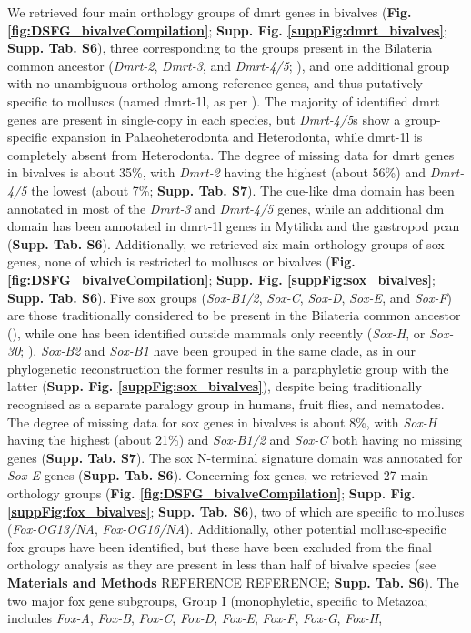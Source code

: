 \documentclass[../main.tex]{subfiles}
\begin{document}
We retrieved four main orthology groups of \gls{dmrt} genes in bivalves (\textbf{Fig. \ref{fig:DSFG_bivalveCompilation}}; \textbf{Supp. Fig. \ref{suppFig:dmrt_bivalves}}; \textbf{Supp. Tab. S6}), three corresponding to the groups present in the Bilateria common ancestor (\textit{Dmrt-2}, \textit{Dmrt-3}, and \textit{Dmrt-4/5}; \textbf{\cite{mawaribuchi2019independent}}), and one additional group with no unambiguous ortholog among reference genes, and thus putatively specific to molluscs (named \gls{dmrt-1l}, as per \textbf{\cite{li2018foxl2,evensen2022comparative}}). The majority of identified \gls{dmrt} genes are present in single-copy in each species, but \textit{Dmrt-4/5}s show a group-specific expansion in Palaeoheterodonta and Heterodonta, while \gls{dmrt-1l} is completely absent from Heterodonta. The degree of missing data for \gls{dmrt} genes in bivalves is about 35\%, with \textit{Dmrt-2} having the highest (about 56\%) and \textit{Dmrt-4/5} the lowest (about 7\%; \textbf{Supp. Tab. S7}). The \gls{cue}-like \gls{dma} domain has been annotated in most of the \textit{Dmrt-3} and \textit{Dmrt-4/5} genes, while an additional \gls{dm} domain has been annotated in \gls{dmrt-1l} genes in Mytilida and the gastropod \gls{pcan} (\textbf{Supp. Tab. S6}). Additionally, we retrieved six main orthology groups of \gls{sox} genes, none of which is restricted to molluscs or bivalves (\textbf{Fig. \ref{fig:DSFG_bivalveCompilation}}; \textbf{Supp. Fig. \ref{suppFig:sox_bivalves}}; \textbf{Supp. Tab. S6}). Five \gls{sox} groups (\textit{Sox-B1/2}, \textit{Sox-C}, \textit{Sox-D}, \textit{Sox-E}, and \textit{Sox-F}) are those traditionally considered to be present in the Bilateria common ancestor (\textbf{\cite{phochanukul2010no}}), while one has been identified outside mammals only recently (\textit{Sox-H}, or \textit{Sox-30}; \textbf{\cite{han2010characterization}}). \textit{Sox-B2} and \textit{Sox-B1} have been grouped in the same clade, as in our phylogenetic reconstruction the former results in a paraphyletic group with the latter (\textbf{Supp. Fig. \ref{suppFig:sox_bivalves}}), despite being traditionally recognised as a separate paralogy group in humans, fruit flies, and nematodes. The degree of missing data for \gls{sox} genes in bivalves is about 8\%, with \textit{Sox-H} having the highest (about 21\%) and \textit{Sox-B1/2} and \textit{Sox-C} both having no missing genes (\textbf{Supp. Tab. S7}). The \gls{sox} N-terminal signature domain was annotated for \textit{Sox-E} genes (\textbf{Supp. Tab. S6}). Concerning \gls{fox} genes, we retrieved 27 main orthology groups (\textbf{Fig. \ref{fig:DSFG_bivalveCompilation}}; \textbf{Supp. Fig. \ref{suppFig:fox_bivalves}}; \textbf{Supp. Tab. S6}), two of which are specific to molluscs (\textit{Fox-OG13/NA}, \textit{Fox-OG16/NA}). Additionally, other potential mollusc-specific \gls{fox} groups have been identified, but these have been excluded from the final orthology analysis as they are present in less than half of bivalve species (see \textbf{Materials and Methods} REFERENCE REFERENCE; \textbf{Supp. Tab. S6}). The two major \gls{fox} gene subgroups, Group I (monophyletic, specific to Metazoa; includes \textit{Fox-A}, \textit{Fox-B}, \textit{Fox-C}, \textit{Fox-D}, \textit{Fox-E}, \textit{Fox-F}, \textit{Fox-G}, \textit{Fox-H}, 
\end{document}
